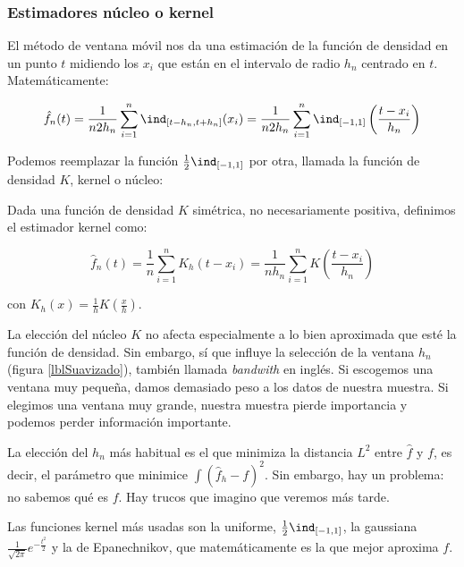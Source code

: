 \documentclass{apuntes}
\begin{document}
\subsubsection{Estimadores núcleo o kernel}
\label{secEst}
\begin{defn}
El método de ventana móvil nos da una estimación de la función de densidad en un punto $t$ midiendo los $x_i$ que están en el intervalo de radio $h_n$ centrado en $t$. Matemáticamente:

\[ \hat{f}_n(t) = \frac{1}{n2h_n}\sum_{i=1}^n \ind_{[t-h_n, t+h_n]}(x_i) = \frac{1}{n2h_n}\sum_{i=1}^n \ind_{[-1,1]}\left(\frac{t-x_i}{h_n}\right) \]
\end{defn}

Podemos reemplazar la función $\frac{1}{2}\ind_{[-1, 1]}$ por otra, llamada la función de densidad $K$, kernel o núcleo:

\begin{defn}
Dada una función de densidad $K$ simétrica, no necesariamente positiva, definimos el estimador kernel como:

\[ \hat{f}_n(t) = \frac{1}{n}\sum_{i=1}^n K_h (t - x_i)  = \frac{1}{nh_n} \sum_{i=1}^n K\left(\frac{t-x_i}{h_n}\right) \]

con $K_h(x) = \frac{1}{h}K(\frac{x}{h})$.
\end{defn}

La elección del núcleo $K$ no afecta especialmente a lo bien aproximada que esté la función de densidad. Sin embargo, sí que influye la selección de la ventana $h_n$ (figura \ref{lblSuavizado}), también llamada \textit{bandwith} en inglés.  Si escogemos una ventana muy pequeña, damos demasiado peso a los datos de nuestra muestra. Si elegimos una ventana muy grande, nuestra muestra pierde importancia y podemos perder información importante.

La elección del $h_n$ más habitual es el que minimiza la distancia $L^2$ entre $\hat{f}$ y $f$, es decir, el parámetro que minimice $\displaystyle\int\left(\hat{f}_h-f\right)^2$. Sin embargo, hay un problema: no sabemos qué es $f$. Hay trucos que imagino que veremos más tarde.


Las funciones kernel más usadas son la uniforme, $\frac{1}{2}\ind_{[-1, 1]}$, la gaussiana $\frac{1}{\sqrt{2 \pi}}e^{-\frac{t^2}{2}}$ y la de Epanechnikov, que matemáticamente es la que mejor aproxima $f$.
\end{document}
